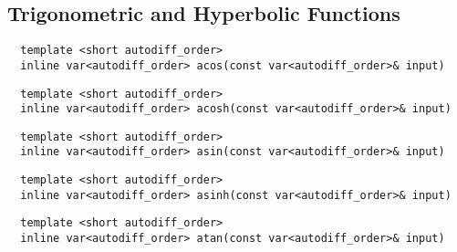 \subsection{Trigonometric and Hyperbolic Functions}

\begin{tcolorbox}[colback=white,colframe=gray90, coltitle=black,boxrule=3pt,
fonttitle=\bfseries,title=Arc Cosine]

\begin{verbatim}
  template <short autodiff_order>
  inline var<autodiff_order> acos(const var<autodiff_order>& input)
\end{verbatim}

\end{tcolorbox}

\begin{tcolorbox}[colback=white,colframe=gray90, coltitle=black,boxrule=3pt,
fonttitle=\bfseries,title=Arc Hyperbolic Cosine]

\begin{verbatim}
  template <short autodiff_order>
  inline var<autodiff_order> acosh(const var<autodiff_order>& input)
\end{verbatim}

\end{tcolorbox}

\begin{tcolorbox}[colback=white,colframe=gray90, coltitle=black,boxrule=3pt,
fonttitle=\bfseries,title=Arc Sine]

\begin{verbatim}
  template <short autodiff_order>
  inline var<autodiff_order> asin(const var<autodiff_order>& input)
\end{verbatim}

\end{tcolorbox}

\begin{tcolorbox}[colback=white,colframe=gray90, coltitle=black,boxrule=3pt,
fonttitle=\bfseries,title=Arc Hyperbolic Sine]

\begin{verbatim}
  template <short autodiff_order>
  inline var<autodiff_order> asinh(const var<autodiff_order>& input)
\end{verbatim}

\end{tcolorbox}

\begin{tcolorbox}[colback=white,colframe=gray90, coltitle=black,boxrule=3pt,
fonttitle=\bfseries,title=Arc Tangent]

\begin{verbatim}
  template <short autodiff_order>
  inline var<autodiff_order> atan(const var<autodiff_order>& input)
\end{verbatim}

\end{tcolorbox}

